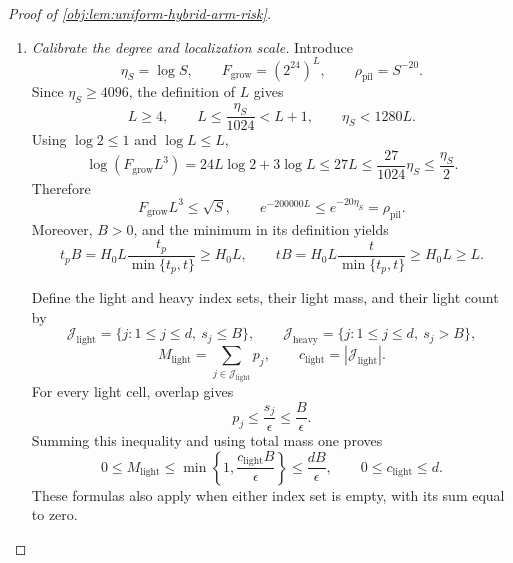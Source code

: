 \documentclass[11pt]{article}
\begin{document}
\begin{proof}[Proof of \cref{obj:lem:uniform-hybrid-arm-risk}]
\begin{enumerate}
\item \textit{Calibrate the degree and localization scale.}
Introduce
\[
\eta_S=\log S,\qquad
F_{\mathrm{grow}}=(2^{24})^L,\qquad
\rho_{\mathrm{pil}}=S^{-20}.
\]
Since \(\eta_S\ge4096\), the definition of \(L\) gives
\[
L\ge4,\qquad
L\le\frac{\eta_S}{1024}<L+1,\qquad
\eta_S<1280L.
\]
Using \(\log2\le1\) and \(\log L\le L\),
\[
\log(F_{\mathrm{grow}}L^3)
=24L\log2+3\log L
\le27L
\le\frac{27}{1024}\eta_S
\le\frac{\eta_S}{2}.
\]
Therefore
\[
F_{\mathrm{grow}}L^3\le\sqrt S,
\qquad
e^{-200000L}\le e^{-20\eta_S}=\rho_{\mathrm{pil}}.
\]
Moreover, \(B>0\), and the minimum in its definition yields
\[
t_pB
=H_0L\frac{t_p}{\min\{t_p,t\}}\ge H_0L,
\qquad
tB
=H_0L\frac{t}{\min\{t_p,t\}}\ge H_0L\ge L.
\]

Define the light and heavy index sets, their light mass, and their light count by
\[
\mathcal J_{\mathrm{light}}=\{j:1\le j\le d,\ s_j\le B\},
\qquad
\mathcal J_{\mathrm{heavy}}=\{j:1\le j\le d,\ s_j>B\},
\]
\[
M_{\mathrm{light}}=\sum_{j\in\mathcal J_{\mathrm{light}}}p_j,
\qquad
c_{\mathrm{light}}=|\mathcal J_{\mathrm{light}}|.
\]
For every light cell, overlap gives
\[
p_j\le\frac{s_j}{\epsilon}\le\frac B\epsilon.
\]
Summing this inequality and using total mass one proves
\[
0\le M_{\mathrm{light}}
\le\min\left\{1,\frac{c_{\mathrm{light}}B}{\epsilon}\right\}
\le\frac{dB}{\epsilon},
\qquad
0\le c_{\mathrm{light}}\le d.
\]
These formulas also apply when either index set is empty, with its sum equal to zero.


\end{enumerate}
\end{proof}
\end{document}
